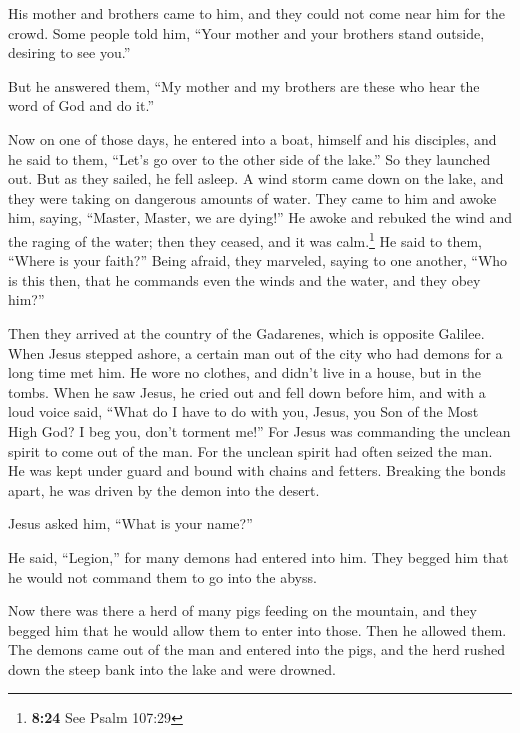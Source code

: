  His mother and brothers came to him, and they could not
come near him for the crowd.  Some people told him,
``Your mother and your brothers stand outside, desiring to see you.''

 But he answered them, ``My mother and my brothers are
these who hear the word of God and do it.''

 Now on one of those days, he entered into a boat,
himself and his disciples, and he said to them, ``Let's go over to the
other side of the lake.'' So they launched out.  But as
they sailed, he fell asleep. A wind storm came down on the lake, and
they were taking on dangerous amounts of water.  They
came to him and awoke him, saying, ``Master, Master, we are dying!'' He
awoke and rebuked the wind and the raging of the water; then they
ceased, and it was calm.\footnote{\textbf{8:24} See Psalm 107:29}
 He said to them, ``Where is your faith?'' Being afraid,
they marveled, saying to one another, ``Who is this then, that he
commands even the winds and the water, and they obey him?''

 Then they arrived at the country of the Gadarenes, which
is opposite Galilee.  When Jesus stepped ashore, a
certain man out of the city who had demons for a long time met him. He
wore no clothes, and didn't live in a house, but in the tombs.
 When he saw Jesus, he cried out and fell down before
him, and with a loud voice said, ``What do I have to do with you, Jesus,
you Son of the Most High God? I beg you, don't torment me!''
 For Jesus was commanding the unclean spirit to come out
of the man. For the unclean spirit had often seized the man. He was kept
under guard and bound with chains and fetters. Breaking the bonds apart,
he was driven by the demon into the desert.

 Jesus asked him, ``What is your name?''

He said, ``Legion,'' for many demons had entered into him.
 They begged him that he would not command them to go
into the abyss.

 Now there was there a herd of many pigs feeding on the
mountain, and they begged him that he would allow them to enter into
those. Then he allowed them.  The demons came out of the
man and entered into the pigs, and the herd rushed down the steep bank
into the lake and were drowned.

